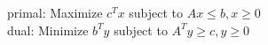 primal: Maximize $c^Tx$ subject to $Ax \le b, x \geq 0$\\
dual: Minimize $b^Ty$ subject to $A^Ty \geq c, y \geq 0$\\
\hline
